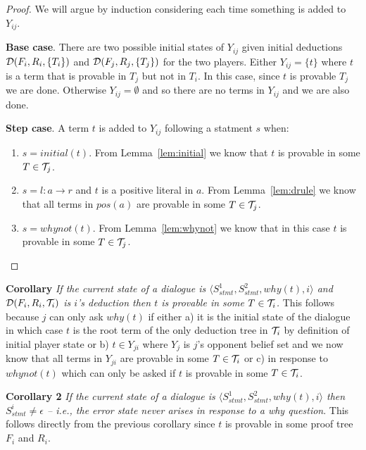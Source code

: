 \documentclass{blue-book}
\newcommand{\drule}[3]{\ensuremath{#1:#2 \rightarrow #3}}
\newcommand{\deduction}[3]{\ensuremath{{\cal D}(#1, #2, #3)}}
\begin{document}
\begin{proof}
We will argue by induction considering each time something is added to $Y_{ij}$.

{\bf Base case}.  There are two possible initial states of $Y_{ij}$ given initial deductions $\deduction{F_i}{R_i}{\{T_i\}}$ and $\deduction{F_j}{R_j}{\{T_j\}}$ for the two players.  Either $Y_{ij} = \{t\}$ where $t$ is a term that is provable in $T_j$ but not in $T_i$.  In this case, since $t$ is provable $T_j$ we are done.  Otherwise $Y_{ij} = \emptyset$ and so there are no terms in $Y_{ij}$ and we are also done.

{\bf Step case}.  A term $t$ is added to $Y_{ij}$ following a statment $s$ when:
\begin{enumerate}
\item  $s = initial(t)$.  From Lemma~\ref{lem:initial} we know that  $t$ is provable in some $T \in {\cal T}_j$.  
\item $s = \drule{l}{a}{r}$ and $t$ is a positive literal in $a$.  From Lemma~\ref{lem:drule} we know that all terms in $pos(a)$ are provable in  some $T \in {\cal T}_j$.
\item $s = whynot(t)$.  From Lemma~\ref{lem:whynot} we  know that in this case $t$ is provable in some $T \in {\cal T}_j$.  
\end{enumerate}
\end{proof}
{\bf Corollary} \emph{If the current state of a dialogue is $\langle S^1_{stmt}, S^2_{stmt}, why(t), i\rangle$ and $\deduction{F_i}{R_i}{{\cal T}_i}$ is $i$'s deduction then $t$ is provable in some $T \in {\cal T}_i$.}  This follows because $j$ can only ask $why(t)$ if either a) it is the initial state of the dialogue in which case $t$ is the root term of the only deduction tree in ${\cal T}_i$ by definition of initial player state or b) $t \in Y_{ji}$ where $Y_{j}$ is $j$'s opponent belief set and we now know that all terms in $Y_{ji}$ are provable in some $T \in {\cal T}_i$  or c) in response to $whynot(t)$ which can only be asked if $t$ is provable in some $T \in {\cal T}_i$.

{\bf Corollary 2} \emph{If the current state of a dialogue is $\langle S^1_{stmt}, S^2_{stmt}, why(t), i\rangle$ then $S^i_{stmt} \neq \epsilon$ -- i.e., the error state never arises in response to a why question}. This follows directly from the previous corollary since $t$ is provable in some proof tree $F_i$ and $R_i$.
\end{document}
